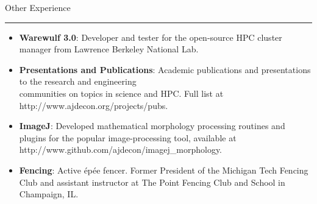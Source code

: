 \documentclass[10pt]{article}
\newcommand{\bigsection}[1]{	
	\vspace{4pt}
	{\fontfamily{phv}\selectfont\Large#1}

	\vspace{-10pt} \rule{\textwidth}{1pt}
}
\begin{document}


\vspace{16pt}


\bigsection{Other Experience}
\vspace{-15pt}
\begin{itemize}\setlength{\itemsep}{0cm}
  \setlength{\parskip}{0cm}
    \item \textbf{Warewulf 3.0}: Developer and tester for the open-source HPC cluster manager from Lawrence Berkeley National Lab.
    \item \textbf{Presentations and Publications}: Academic publications and presentations to the research and engineering \\ 
    communities on topics in science and HPC. Full list at http://www.ajdecon.org/projects/pubs.
    \item \textbf{ImageJ}: Developed mathematical morphology processing routines and plugins for the popular image-processing tool, available at http://www.github.com/ajdecon/imagej\_morphology.
    \item \textbf{Fencing}: Active \'{e}p\'{e}e fencer. Former President of the Michigan Tech Fencing Club and assistant instructor at The Point Fencing Club and School in Champaign, IL.

\end{itemize}
\end{document}
